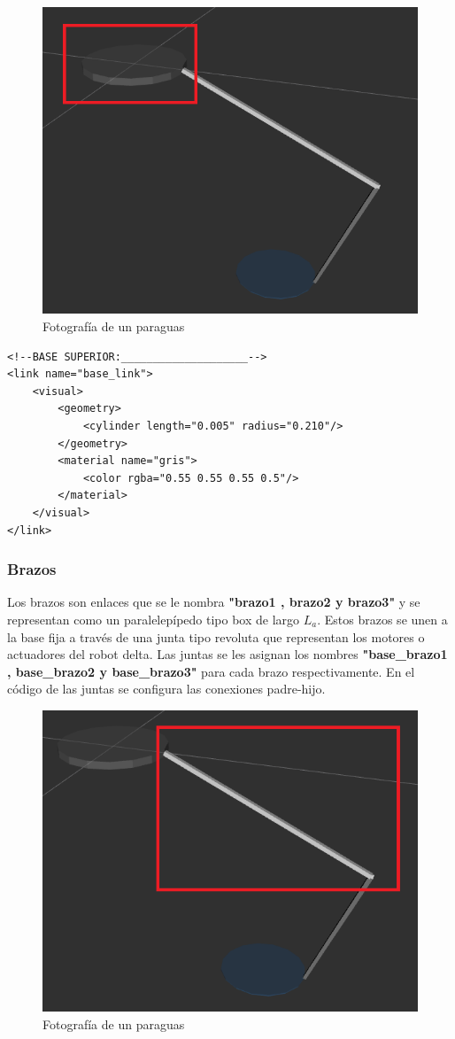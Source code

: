              \begin{figure}[h]
                \centering
                \includegraphics[width=0.6\linewidth]{Main/Chapter6/Images6/cap6_basefija.png}
                \caption{Fotografía de un paraguas}
                \label{f:Cap6_urdf_1}
            \end{figure}  


        \lstset{language=XML}
        \begin{lstlisting}
<!--BASE SUPERIOR:____________________-->
<link name="base_link">
	<visual>
		<geometry>
			<cylinder length="0.005" radius="0.210"/> 
		</geometry>
		<material name="gris">
			<color rgba="0.55 0.55 0.55 0.5"/>
		</material>
	</visual>
</link>
        \end{lstlisting}

      \newpage

       \subsubsection{Brazos}
        Los brazos son enlaces que se le nombra \textbf{"brazo1 , brazo2 y brazo3"} y se representan como un paralelepípedo tipo box de largo \textbf{$L_a$}. Estos brazos se unen a la base fija a través de una junta tipo revoluta que representan los motores o actuadores del robot delta. Las juntas se les asignan los nombres \textbf{"base\_brazo1 , base\_brazo2 y base\_brazo3"} para cada brazo respectivamente. En el código de las juntas se configura las conexiones padre-hijo.
        
        
             \begin{figure}[h]
                \centering
                \includegraphics[width=0.4\linewidth]{Main/Chapter6/Images6/cap6_brazo.png}
                \caption{Fotografía de un paraguas}
                \label{f:Cap6_urdf_2}
            \end{figure}  
            


